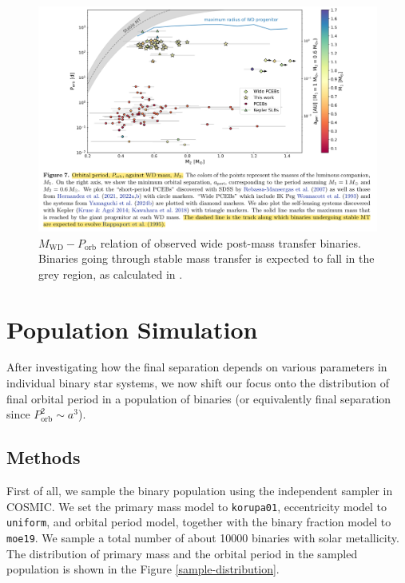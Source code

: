 \documentclass[12pt]{article}
\newcommand{\Porb}{P_{\mathrm{orb}}}
\begin{document}
\begin{figure}
    \centering
    \includegraphics[width=\linewidth]{fig/theory-observed.png}
    \caption{$M_{\mathrm{WD}} - P_{\mathrm{orb}}$ relation of observed wide post-mass transfer binaries. Binaries going through stable mass transfer is expected to fall in the grey region, as calculated in \cite{rappaport1995relation}.}
    \label{theory-observed}
\end{figure}

\section{Population Simulation}
After investigating how the final separation depends on various parameters in individual binary star systems, we now shift our focus onto the distribution of final orbital period in a population of binaries (or equivalently final separation since $\Porb^2 \sim a^3$).

\subsection{Methods}

First of all, we sample the binary population using the independent sampler in COSMIC. We set the primary mass model to \verb|korupa01|, eccentricity model to \verb|uniform|, and orbital period model, together with the binary fraction model to \verb|moe19|. We sample a total number of about 10000 binaries with solar metallicity. The distribution of primary mass and the orbital period in the sampled population is shown in the Figure \ref{sample-distribution}.
\end{document}
